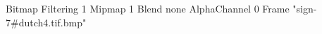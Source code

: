 {Bitmap
	{Filtering 1}
	{Mipmap 1}
	{Blend none}
	{AlphaChannel 0}
	{Frame "sign-7#dutch4.tif.bmp"}
}
